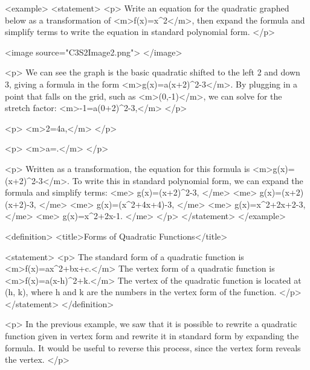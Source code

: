         <example>
            <statement>
                <p>
                    Write an equation for the quadratic graphed below as a transformation of <m>f(x)=x^{2}</m>, then expand the formula and simplify terms to write the equation in standard polynomial form.
                </p>

                <image source="C3S2Image2.png">
                </image>

                <p>
                    We can see the graph is the basic quadratic shifted to the left 2 and down 3, giving a formula in the form <m>g(x)=a(x+2)^{2}-3</m>.
                    By plugging in a point that falls on the grid, such as <m>(0,-1)</m>, we can solve for the stretch factor: <m>-1=a(0+2)^{2}-3,</m>
                </p>

                <p>
                    <m>2=4a,</m>
                </p>

                <p>
                    <m>a=.</m>
                </p>

                <p>
                    Written as a transformation, the equation for this formula is <m>g(x)=(x+2)^{2}-3</m>.
                    To write this in standard polynomial form, we can expand the formula and simplify terms:
                    <me>
                        g(x)=(x+2)^{2}-3,
                    </me>
                    <me>
                        g(x)=(x+2)(x+2)-3,
                    </me>
                    <me>
                        g(x)=(x^{2}+4x+4)-3,
                    </me>
                    <me>
                        g(x)=x^{2}+2x+2-3,
                    </me>
                    <me>
                        g(x)=x^{2}+2x-1.
                    </me>
                </p>
            </statement>
        </example>

        <definition>
            <title>Forms of Quadratic Functions</title>

            <statement>
                <p>
                    The standard form of a quadratic function is <m>f(x)=ax^{2}+bx+c.</m> The vertex form of a quadratic function is <m>f(x)=a(x-h)^{2}+k.</m> The vertex of the quadratic function is located at (h, k), where h and k are the numbers in the vertex form of the function.
                </p>
            </statement>
        </definition>

        <p>
            In the previous example, we saw that it is possible to rewrite a quadratic function given in vertex form and rewrite it in standard form by expanding the formula.
            It would be useful to reverse this process, since the vertex form reveals the vertex.
        </p>

